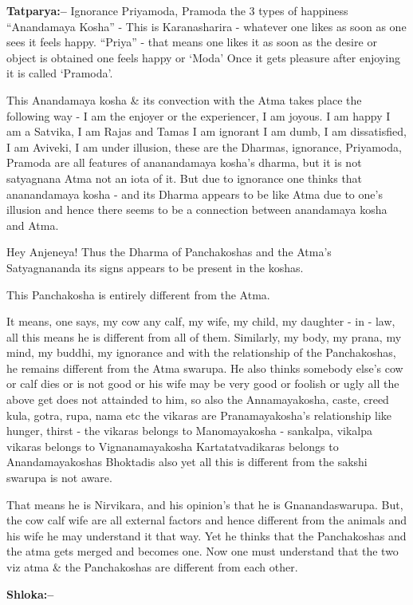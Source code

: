 \textbf{Tatparya:–} Ignorance Priyamoda, Pramoda the 3 types of happiness “Anandamaya Kosha” - This is Karanasharira - whatever one likes as soon as one sees it feels happy. “Priya” - that means one likes it as soon as the desire or object is obtained one feels happy or ‘Moda’ Once it gets pleasure after enjoying it is called ‘Pramoda’.

This Anandamaya kosha \& its convection with the Atma takes place the following way - I am the enjoyer or the experiencer, I am joyous. I am happy I am a Satvika, I am Rajas and Tamas I am ignorant I am dumb, I am dissatisfied, I am Aviveki, I am under illusion, these are the Dharmas, ignorance, Priyamoda, Pramoda are all features of ananandamaya kosha's dharma, but it is not satyagnana Atma not an iota of it. But due to ignorance one thinks that ananandamaya kosha - and its Dharma appears to be like Atma due to one's illusion and hence there seems to be a connection between anandamaya kosha and Atma.

Hey Anjeneya! Thus the Dharma of Panchakoshas and the Atma's Satyagnananda its signs appears to be present in the koshas.

This Panchakosha is entirely different from the Atma.

It means, one says, my cow any calf, my wife, my child, my daughter - in - law, all this means he is different from all of them. Similarly, my body, my prana, my mind, my buddhi, my ignorance and with the relationship of the Panchakoshas, he remains different from the Atma swarupa. He also thinks somebody else's cow or calf dies or is not good or his wife may be very good or foolish or ugly all the above get does not attainded to him, so also the Annamayakosha, caste, creed kula, gotra, rupa, nama etc the vikaras are Pranamayakosha's relationship like hunger, thirst - the vikaras belongs to Manomayakosha - sankalpa, vikalpa vikaras belongs to Vignanamayakosha Kartatatvadikaras belongs to Anandamayakoshas Bhoktadis also yet all this is different from the sakshi swarupa is not aware.

That means he is Nirvikara, and his opinion's that he is Gnananda\break swarupa. But, the cow calf wife are all external factors and hence different from the animals and his wife he may understand it that way. Yet he thinks that the Panchakoshas and the atma gets merged and becomes one. Now one must understand that the two viz atma \& the Panchakoshas are different from each other.

\textbf{ Shloka:– }

